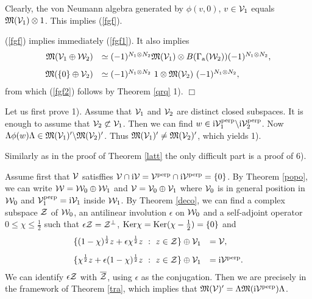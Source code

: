 \documentclass{svmult}
\newcommand{\beq}{\begin{equation}}
\newcommand{\eeq}{\end{equation}}
\def\bar{\overline}
\def\perpr{{\rm perp}}
\def\cZ{{\cal Z}}
\def\cV{{\cal V}}
\def\cW{{\cal W}}
\def\fM{{\mathfrak M}}
\def\a{{\rm a}}
\def\i{{\rm i}}
\def\Ker{{\rm Ker}}
\def\qed{$\Box$\medskip}
\def\one{{\bf 1}}
\def\Ker{{\rm Ker}}
\def\one{{ 1}}
\begin{document}
Clearly, the von Neumann algebra generated by $\phi(v,0)$, $v\in\cV_1$ equals
$\fM(\cV_1)\otimes 1$. This implies (\ref{fgf}).

(\ref{fgf}) implies immediately (\ref{fgf1}).
It also implies
\beq\begin{array}{rl}
\fM(\cV_1\oplus\cW_2)&\simeq(-1)^{N_1\otimes N_2}
\fM(\cV_1)\otimes B(\Gamma_\a(\cW_2))(-1)^{N_1\otimes N_2},\\[3mm]
\fM(\{0\}\oplus \cV_2)&\simeq(-1)^{N_1\otimes N_2}\ \one\otimes
\fM(\cV_2)\ (-1)^{N_1\otimes N_2},\end{array}
\label{fgf3}\eeq
from which (\ref{fgf2}) follows by Theorem \ref{qrq} 1).
\qed


Let us first prove 1). 
Assume that $\cV_1$ and $\cV_2$ are distinct closed subspaces. It
is enough to assume that $\cV_2\not\subset\cV_1$. Then we can find
$w\in\i\cV_1^\perpr\backslash\i\cV_2^\perpr$. Now
$\Lambda\phi(w)\Lambda\in\fM(\cV_1)'\backslash\fM(\cV_2)'$. 
Thus $\fM(\cV_1)'\neq\fM(\cV_2)'$, which yields 1).

Similarly as in the proof of Theorem \ref{latt}
the only difficult part is a proof of  6).


Assume first that $\cV$ satisffies
 $\cV\cap\i\cV=\cV^\perpr\cap\i\cV^\perpr=\{0\}$. By Theorem \ref{popo}, we can
 write $\cW=\cW_0\oplus\cW_1$ and $\cV=\cV_0\oplus\cV_1$ where $\cV_0$  
is in general position in $\cW_0$ and $\cV_1^\perpr=\i\cV_1$ inside $\cW_1$.
By Theorem \ref{deco}, we can find a complex subspace $\cZ$ of $\cW_0$, an
 antilinear involution $\epsilon$ on $\cW_0$ and a self-adjoint operator $0\leq 
\chi\leq \frac12$ such that $\epsilon\cZ=\cZ^\perp$,
 $\Ker\chi=\Ker(\chi-\frac12)=\{0\}$ and 
\[\begin{array}{rl}
 \{(1-\chi)^\frac12z+\epsilon\chi^\frac12 z\ : \
z\in\cZ\}\oplus\cV_1&=\cV,\\[3mm]
 \{\chi^\frac12z+\epsilon(1-\chi)^\frac12 z\ : \
z\in\cZ\}\oplus\cV_1&=\i\cV^\perpr.
\end{array}\]
We can identify  $\epsilon\cZ$ with $\bar\cZ$, using $\epsilon$ as the
conjugation. Then we are precisely in the framework of Theorem \ref{tra}, which
implies that $\fM(\cV)'=\Lambda  \fM(\i\cV^\perpr)\Lambda$.
\end{document}

